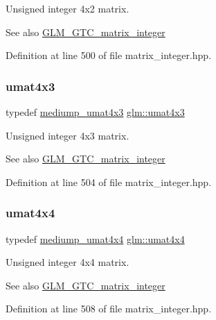 Unsigned integer 4x2 matrix. \begin{DoxySeeAlso}{See also}
\hyperlink{group__gtc__matrix__integer}{G\+L\+M\+\_\+\+G\+T\+C\+\_\+matrix\+\_\+integer} 
\end{DoxySeeAlso}


Definition at line 500 of file matrix\+\_\+integer.\+hpp.

\mbox{\label{group__gtc__matrix__integer_ga08373f5588a54da1a48e5e55c7d51004}} 
\subsubsection{\texorpdfstring{umat4x3}{umat4x3}}
{\footnotesize\ttfamily typedef \hyperlink{group__gtc__matrix__integer_gaebe3b1b4b6030c096447e40fb00528f4}{mediump\+\_\+umat4x3} \hyperlink{group__gtc__matrix__integer_ga08373f5588a54da1a48e5e55c7d51004}{glm\+::umat4x3}}

Unsigned integer 4x3 matrix. \begin{DoxySeeAlso}{See also}
\hyperlink{group__gtc__matrix__integer}{G\+L\+M\+\_\+\+G\+T\+C\+\_\+matrix\+\_\+integer} 
\end{DoxySeeAlso}


Definition at line 504 of file matrix\+\_\+integer.\+hpp.

\mbox{\label{group__gtc__matrix__integer_gae0931b79e808fb0983848778a60eb548}} 
\subsubsection{\texorpdfstring{umat4x4}{umat4x4}}
{\footnotesize\ttfamily typedef \hyperlink{group__gtc__matrix__integer_ga24b1c76fefa58f810e24cafe0ea6a6a0}{mediump\+\_\+umat4x4} \hyperlink{group__gtc__matrix__integer_gae0931b79e808fb0983848778a60eb548}{glm\+::umat4x4}}

Unsigned integer 4x4 matrix. \begin{DoxySeeAlso}{See also}
\hyperlink{group__gtc__matrix__integer}{G\+L\+M\+\_\+\+G\+T\+C\+\_\+matrix\+\_\+integer} 
\end{DoxySeeAlso}


Definition at line 508 of file matrix\+\_\+integer.\+hpp.

